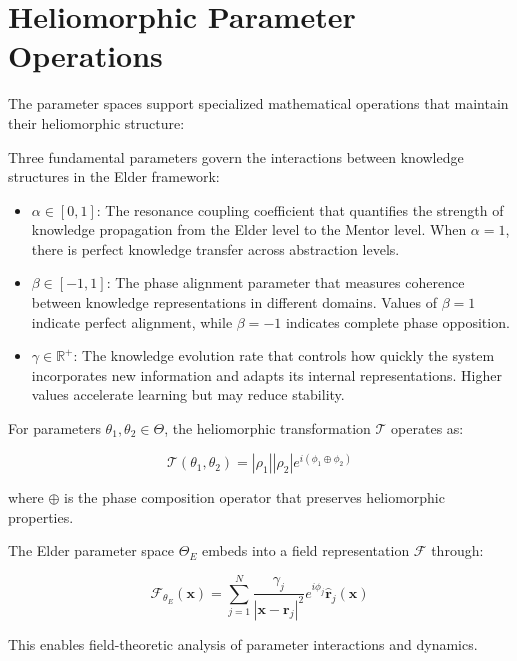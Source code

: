 \section{Heliomorphic Parameter Operations}

The parameter spaces support specialized mathematical operations that maintain their heliomorphic structure:

\begin{definition}
Three fundamental parameters govern the interactions between knowledge structures in the Elder framework:

\begin{itemize}
    \item $\alpha \in [0,1]$: The resonance coupling coefficient that quantifies the strength of knowledge propagation from the Elder level to the Mentor level. When $\alpha = 1$, there is perfect knowledge transfer across abstraction levels.
    
    \item $\beta \in [-1,1]$: The phase alignment parameter that measures coherence between knowledge representations in different domains. Values of $\beta = 1$ indicate perfect alignment, while $\beta = -1$ indicates complete phase opposition.
    
    \item $\gamma \in \mathbb{R}^+$: The knowledge evolution rate that controls how quickly the system incorporates new information and adapts its internal representations. Higher values accelerate learning but may reduce stability.
\end{itemize}
\end{definition}

\begin{theorem}
For parameters $\theta_1, \theta_2 \in \Theta$, the heliomorphic transformation $\mathcal{T}$ operates as:

\begin{equation}
\mathcal{T}(\theta_1, \theta_2) = |\rho_1||\rho_2|e^{i(\phi_1 \oplus \phi_2)}
\end{equation}

where $\oplus$ is the phase composition operator that preserves heliomorphic properties.
\end{theorem}

\begin{theorem}
The Elder parameter space $\Theta_E$ embeds into a field representation $\mathcal{F}$ through:

\begin{equation}
\mathcal{F}_{\theta_E}(\mathbf{x}) = \sum_{j=1}^N \frac{\gamma_j}{|\mathbf{x} - \mathbf{r}_j|^2} e^{i\phi_j} \hat{\mathbf{r}}_j(\mathbf{x})
\end{equation}

This enables field-theoretic analysis of parameter interactions and dynamics.
\end{theorem}

